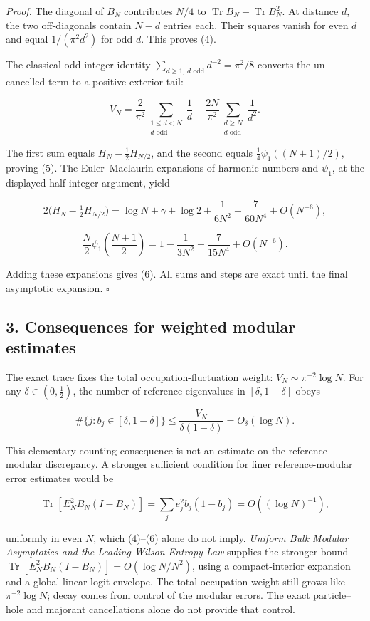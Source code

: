 \documentclass[
  10pt,
  a4paper,
]{article}
\begin{document}
\emph{Proof.} The diagonal of \(B_N\) contributes \(N/4\) to \(\operatorname{Tr}B_N-\operatorname{Tr}B_N^2\). At distance \(d\), the two off-diagonals contain \(N-d\) entries each. Their squares vanish for even \(d\) and equal \(1/(\pi^2d^2)\) for odd \(d\). This proves (4).

The classical odd-integer identity \(\sum_{d\ge1,\ d\text{ odd}}d^{-2}=\pi^2/8\) converts the un-cancelled term to a positive exterior tail:

\[
V_N=\frac2{\pi^2}\sum_{\substack{1\le d<N\\d\text{ odd}}}\frac1d
+\frac{2N}{\pi^2}\sum_{\substack{d\ge N\\d\text{ odd}}}\frac1{d^2}.
\]

The first sum equals \(H_N-\tfrac12H_{N/2}\), and the second equals \(\tfrac14\psi_1((N+1)/2)\), proving (5). The Euler--Maclaurin expansions of harmonic numbers and \(\psi_1\), at the displayed half-integer argument, yield

\[
2\Big(H_N-\tfrac12H_{N/2}\Big)=\log N+\gamma+\log2
+\frac1{6N^2}-\frac7{60N^4}+O(N^{-6}),
\]

\[
\frac{N}{2}\psi_1\left(\frac{N+1}{2}\right)
=1-\frac1{3N^2}+\frac7{15N^4}+O(N^{-6}).
\]

Adding these expansions gives (6). All sums and steps are exact until the final asymptotic expansion. \(\square\)

\subsection{3. Consequences for weighted modular estimates}\label{consequences-for-weighted-modular-estimates}

The exact trace fixes the total occupation-fluctuation weight: \(V_N\sim\pi^{-2}\log N\). For any \(\delta\in(0,\frac12)\), the number of reference eigenvalues in \([\delta,1-\delta]\) obeys

\[
\#\{j:b_j\in[\delta,1-\delta]\}\le\frac{V_N}{\delta(1-\delta)}
=O_\delta(\log N).
\]

This elementary counting consequence is not an estimate on the reference modular discrepancy. A stronger sufficient condition for finer reference-modular error estimates would be

\[
\operatorname{Tr}[E_N^2B_N(I-B_N)]
=\sum_j e_j^2b_j(1-b_j)=O((\log N)^{-1}),
\]

uniformly in even \(N\), which (4)--(6) alone do not imply. \emph{Uniform Bulk Modular Asymptotics and the Leading Wilson Entropy Law} supplies the stronger bound \(\operatorname{Tr}[E_N^2B_N(I-B_N)]=O(\log N/N^2)\), using a compact-interior expansion and a global linear logit envelope. The total occupation weight still grows like \(\pi^{-2}\log N\); decay comes from control of the modular errors. The exact particle--hole and majorant cancellations alone do not provide that control.
\end{document}
